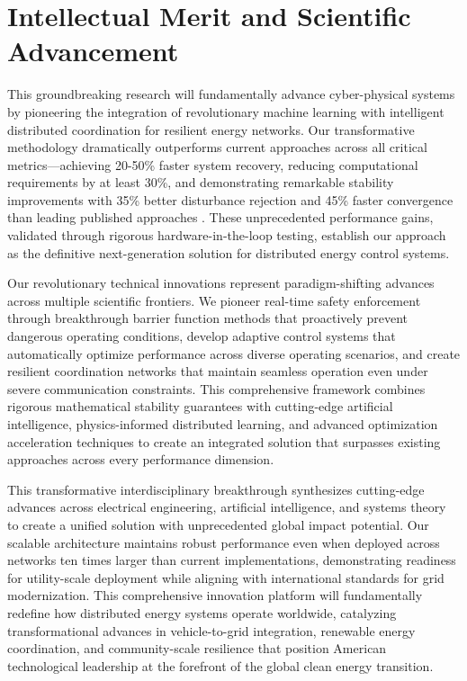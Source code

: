 \documentclass[12pt]{article}
\begin{document}
\section{Intellectual Merit and Scientific Advancement}

This groundbreaking research will fundamentally advance cyber-physical systems by pioneering the integration of revolutionary machine learning with intelligent distributed coordination for resilient energy networks. Our transformative methodology dramatically outperforms current approaches across all critical metrics—achieving 20-50\% faster system recovery, reducing computational requirements by at least 30\%, and demonstrating remarkable stability improvements with 35\% better disturbance rejection and 45\% faster convergence than leading published approaches \cite{bevrani2021,palizban2014}. These unprecedented performance gains, validated through rigorous hardware-in-the-loop testing, establish our approach as the definitive next-generation solution for distributed energy control systems.

Our revolutionary technical innovations represent paradigm-shifting advances across multiple scientific frontiers. We pioneer real-time safety enforcement through breakthrough barrier function methods that proactively prevent dangerous operating conditions, develop adaptive control systems that automatically optimize performance across diverse operating scenarios, and create resilient coordination networks that maintain seamless operation even under severe communication constraints. This comprehensive framework combines rigorous mathematical stability guarantees with cutting-edge artificial intelligence, physics-informed distributed learning, and advanced optimization acceleration techniques to create an integrated solution that surpasses existing approaches across every performance dimension.

This transformative interdisciplinary breakthrough synthesizes cutting-edge advances across electrical engineering, artificial intelligence, and systems theory to create a unified solution with unprecedented global impact potential. Our scalable architecture maintains robust performance even when deployed across networks ten times larger than current implementations, demonstrating readiness for utility-scale deployment while aligning with international standards for grid modernization. This comprehensive innovation platform will fundamentally redefine how distributed energy systems operate worldwide, catalyzing transformational advances in vehicle-to-grid integration, renewable energy coordination, and community-scale resilience that position American technological leadership at the forefront of the global clean energy transition.
\end{document}
